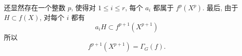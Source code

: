 还显然存在一个整数 \(p\), 使得对 \(1\leq i\leq r\),
每个 \(a_i\) 都属于 \(f^p(X^p)\).
最后, 由于 \(H\subset f(X)\), 对每个 \(i\) 都有
\[
  a_iH\subset f^{p+1}(X^{p+1})
\]
所以
\[
  f^{p+1}(X^{p+1})=\Gamma_G(f).
\]

